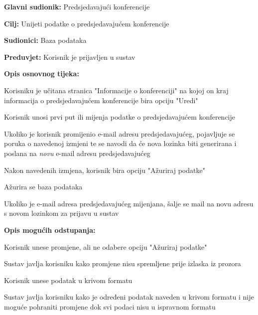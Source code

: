 					\noindent {}
					\begin{packed_item}
						\item \textbf{Glavni sudionik:} Predsjedavajući konferencije
						\item \textbf{Cilj:} Unijeti podatke o predsjedavajućem konferencije
						\item \textbf{Sudionici:} Baza podataka
						\item \textbf{Preduvjet:} Korisnik je prijavljen u sustav
						
						\item \textbf{Opis osnovnog tijeka:} 
						\item[] \begin{packed_enum}
							\item Korisniku je učitana stranica "Informacije o konferenciji" na kojoj on kraj informacija o predsjedavajućem konferencije bira opciju "Uredi"
							\item Korisnik unosi prvi put ili mijenja podatke o predsjedavajućem konferencije
							\item Ukoliko je korisnik promijenio e-mail adresu predsjedavajućeg, pojavljuje se poruka o navedenoj izmjeni te se navodi da će nova lozinka biti generirana i poslana na \textit{novu} e-mail adresu predsjedavajućeg
							\item Nakon navedenih izmjena, korisnik bira opciju "Ažuriraj podatke"
							\item Ažurira se baza podataka
							\item Ukoliko je e-mail adresa predsjedavajućeg mijenjana, šalje se mail na novu adresu s novom lozinkom za prijavu u sustav
						\end{packed_enum}
					
						\item \textbf{Opis mogućih odstupanja:}
						\item[] \begin{packed_enum}

							\item[3.a] Korisnik unese promjene, ali ne odabere opciju "Ažuriraj podatke"
							\item[] \begin{packed_enum}
								\item[1.] Sustav javlja korisniku kako promjene nisu spremljene prije izlaska iz prozora
							\end{packed_enum}
							\item[3.b] Korisnik unese podatak u krivom formatu
							\item[] \begin{packed_enum}
								\item[1.] Sustav javlja korisniku kako je određeni podatak naveden u krivom formatu i nije moguće pohraniti promjene dok svi podaci nisu u ispravnom formatu
							\end{packed_enum}
							
						\end{packed_enum}
					\end{packed_item}


